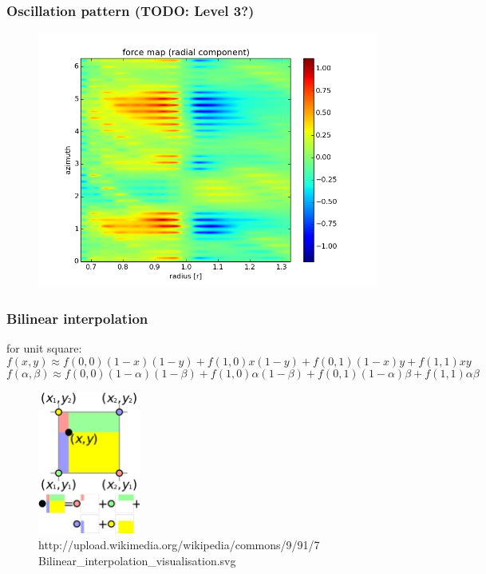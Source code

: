 \documentclass{beamer}
\begin{document}
\begin{frame}
 \frametitle{Oscillation pattern (TODO: Level 3?)}
 \begin{figure}[H]
  \centering
  \includegraphics[width=.8\textwidth]{radial_force_lvl3.png}
 \end{figure} 
\end{frame}
\begin{frame}
 \frametitle{Bilinear interpolation}
 for unit square:
 \begin{equation*}
  f(x,y) \approx f(0,0)(1-x)(1-y) + f(1,0)x(1-y) + f(0,1)(1-x)y + f(1,1)xy
 \end{equation*}
 \begin{equation*}
 f(\alpha,\beta) \approx f(0,0)(1-\alpha)(1-\beta) + f(1,0)\alpha(1-\beta) + f(0,1)(1-\alpha)\beta + f(1,1)\alpha\beta
  \end{equation*}

 \begin{figure}[H]
  \centering
  \includegraphics[width=0.3\textwidth]{bilinear_interpolation_visualisation.png}
  \caption{http://upload.wikimedia.org/wikipedia/commons/9/91/7
	   Bilinear\_interpolation\_visualisation.svg} %
\end{figure}
\end{frame}
\end{document}
